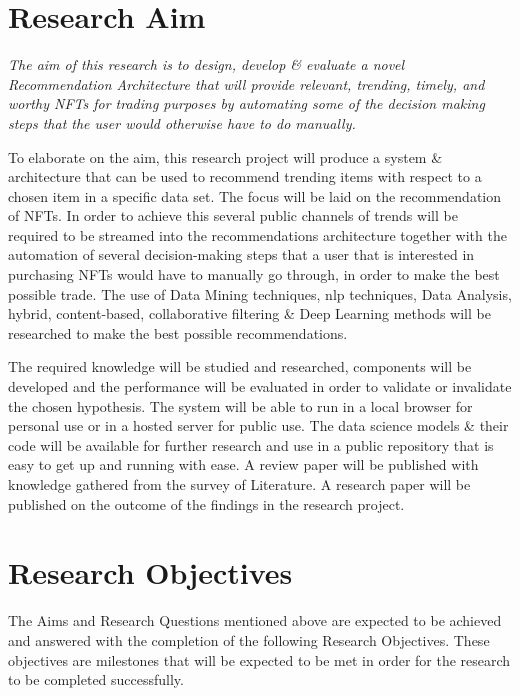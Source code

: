 \section{Research Aim}
\textit{The aim of this research is to design, develop \& evaluate a novel Recommendation Architecture that will provide relevant, trending, timely, and worthy NFTs for trading purposes by automating some of the decision making steps that the user would otherwise have to do manually.}

\bigbreak
To elaborate on the aim, this research project will produce a system \& architecture that can be used to recommend trending items with respect to a chosen item in a specific data set. The focus will be laid on the recommendation of NFTs. In order to achieve this several public channels of trends will be required to be streamed into the recommendations architecture together with the automation of several decision-making steps that a user that is interested in purchasing NFTs would have to manually go through, in order to make the best possible trade. The use of Data Mining techniques, \Gls{nlp} techniques, Data Analysis, hybrid, content-based, collaborative filtering \& Deep Learning methods will be researched to make the best possible recommendations.

The required knowledge will be studied and researched, components will be developed and the performance will be evaluated in order to validate or invalidate the chosen hypothesis. The system will be able to run in a local browser for personal use or in a hosted server for public use. The data science models \& their code will be available for further research and use in a public repository that is easy to get up and running with ease. A review paper will be published with knowledge gathered from the survey of Literature. A research paper will be published on the outcome of the findings in the research project.

\section{Research Objectives}
The Aims and Research Questions mentioned above are expected to be achieved and answered with the completion of the following Research Objectives. These objectives are milestones that will be expected to be met in order for the research to be completed successfully.

\newpage

